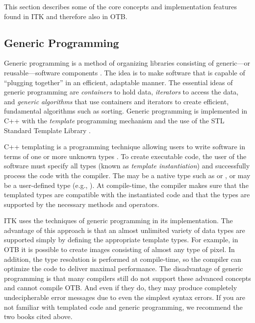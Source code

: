 This section describes some of the core concepts and implementation features
found in ITK and therefore also in OTB.

\subsection{Generic Programming}
\label{sec:GenericProgramming}


Generic programming is a method of organizing libraries consisting of
generic---or reusable---software components \cite{Musser1996}. The idea is to
make software that is capable of ``plugging together'' in an efficient,
adaptable manner. The essential ideas of generic programming are
\emph{containers} to hold data, \emph{iterators} to access the data, and 
\emph{generic algorithms} that use containers and iterators to create 
efficient, fundamental algorithms such as sorting. Generic programming is
implemented in C++ with the \emph{template} programming mechanism and the 
use of the STL Standard Template Library \cite{Austern1999}.

C++ templating is a programming technique allowing users to write software in
terms of one or more unknown types . To create executable code, the
user of the software must specify all types  (known as \emph{template
instantiation}) and successfully process the code with the compiler. The
 may be a native type such as
 or , or  may be a user-defined type (e.g.,
). At compile-time, the compiler makes sure that the templated 
types are compatible with the instantiated code and that the types are
supported by the necessary methods and operators.

ITK uses the techniques of generic programming in its implementation. The
advantage of this approach is that an almost unlimited variety of data types
are supported simply by defining the appropriate template types. For example,
in OTB it is possible to create images consisting of almost any type of
pixel. In addition, the type resolution is performed at compile-time, so the
compiler can optimize the code to deliver maximal performance. The
disadvantage of generic programming is that many compilers still do not
support these advanced concepts and cannot compile OTB. And even if they do,
they may produce completely undecipherable error messages due to even the
simplest syntax errors. If you are not familiar with templated code and
generic programming, we recommend the two books cited above.

